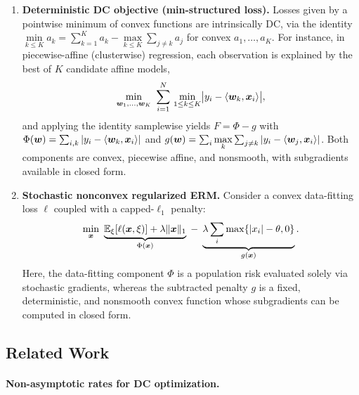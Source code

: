 \documentclass[english]{article}
\begin{document}
\begin{enumerate}
  \item \textbf{Deterministic DC objective (min-structured loss).}
Losses given by a pointwise minimum of convex functions are
intrinsically DC, via the identity
$\min\limits_{k\le K} a_k=\sum_{k=1}^{K}a_k-\max\limits_{k\le K}\sum_{j\ne k}a_j$
for convex $a_1,\dots,a_K$. For instance, in piecewise-affine
(clusterwise) regression, each observation is explained by the best of
$K$ candidate affine models,
\[
   \min\limits_{\bm{w}_1,\dots,\bm{w}_K}\ \sum_{i=1}^{N}\,
   \min\limits_{1\le k\le K}\bigl|y_i-\langle \bm{w}_k,\bm{x}_i\rangle\bigr|,
\]
and applying the identity samplewise yields $F=\Phi-g$ with
$\Phi(\bm{w})=\sum_{i,k}|y_i-\langle \bm{w}_k,\bm{x}_i\rangle|$ and
$g(\bm{w})=\sum_{i}\max\limits_{k}\sum_{j\ne k}|y_i-\langle \bm{w}_j,\bm{x}_i\rangle|$.
Both components are convex, piecewise affine, and nonsmooth, with
subgradients available in closed form.

  \item \textbf{Stochastic nonconvex regularized ERM.}
  Consider a convex data-fitting loss $\ell$ coupled with a capped-$\ell_1$ penalty:
  \[
     \min\limits_{\bx}\ \underbrace{\EE_{\xi}[\ell(\bx,\xi)] + \lambda\|\bx\|_1}_{\Phi(\bx)}
     \;-\;\underbrace{\lambda\sum_i\max\limits\{|x_i|-\theta,0\}}_{g(\bx)}.
  \]
  Here, the data-fitting component $\Phi$ is a population risk evaluated solely via stochastic gradients, whereas the subtracted penalty $g$ is a fixed, deterministic, and nonsmooth convex function whose subgradients can be computed in closed form.
\end{enumerate}

\subsection{Related Work}
\label{subsec:known-and-open}

\paragraph{Non-asymptotic rates for DC optimization.}
\end{document}
